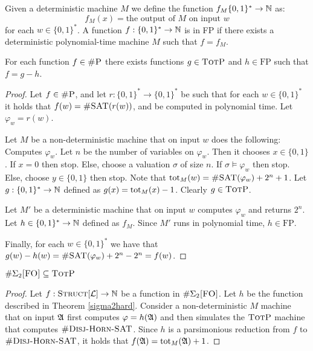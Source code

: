 Given a deterministic machine $M$ we define the function $f_M\{0,1\}^*\to\mathbb{N}$ as:
\[
	f_M(x) = \text{the output of $M$ on input $w$}
\]
for each $w\in\{0,1\}^*$. A function $f:\{0,1\}^*\to\mathbb{N}$ is in FP if there exists a deterministic polynomial-time machine $M$ such that $f = f_M$.
\begin{theo} \label{diff}
	For each function $f\in\textsc{\#P}$ there exists functions $g\in \textsc{TotP}$ and $h\in\text{FP}$ such that $f = g - h$.
\end{theo}
\begin{proof}
	Let $f\in\textsc{\#P}$, and let $r:\{0,1\}^*\to\{0,1\}^*$ be such that for each $w\in\{0,1\}^*$ it holds that $f(w) = \textsc{\#SAT}(r(w))$, and be computed in polynomial time. Let $\varphi_w = r(w)$.
	
	Let $M$ be a non-deterministic machine that on input $w$ does the following: Computes $\varphi_w$. Let $n$ be the number of variables on $\varphi_w$. Then it chooses $x\in\{0,1\}$. If $x = 0$ then stop. Else, choose a valuation $\sigma$ of size $n$. If $\sigma\models\varphi_w$ then stop. Else, choose $y\in\{0,1\}$ then stop. Note that $\text{tot}_M(w) = \textsc{\#SAT}(\varphi_w)+2^n+1$. Let $g:\{0,1\}^*\to\mathbb{N}$ defined as $g(x) = \text{tot}_M(x) - 1$. Clearly $g\in\textsc{TotP}$.
	
	Let $M'$ be a deterministic machine that on input $w$ computes $\varphi_w$ and returns $2^n$. Let $h\in\{0,1\}^*\to\mathbb{N}$ defined as $f_M$. Since $M'$ runs in polynomial time, $h\in\text{FP}$.
	
	Finally, for each $w\in\{0,1\}^*$ we have that $g(w) - h(w) = \textsc{\#SAT}(\varphi_w) + 2^n - 2^n = f(w)$.
\end{proof}

\begin{theo}
	$\#\Sigma_{2}\textsc{[FO]} \subseteq \textsc{TotP}$
\end{theo}
\begin{proof}
	Let $f:\textsc{Struct}[{\cal L}]\to\mathbb{N}$ be a function in $\#\Sigma_{2}\textsc{[FO]}$. Let $h$ be the function described in Theorem \ref{sigma2hard}. Consider a non-deterministic $M$ machine that on input ${\frak A}$ first computes $\varphi = h({\frak A})$ and then simulates the $\textsc{TotP}$ machine that computes $\textsc{\#Disj-Horn-SAT}$. Since $h$ is a parsimonious reduction from $f$ to $\textsc{\#Disj-Horn-SAT}$, it holds that $f({\frak A}) = \text{tot}_M({\frak A})+1$.
\end{proof}